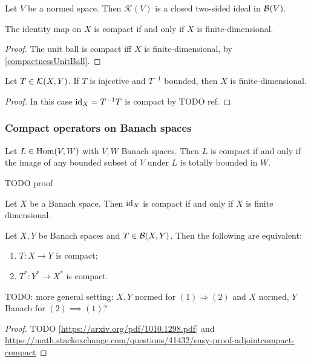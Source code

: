 \begin{proposition}
Let $V$ be a normed space. Then $\mathcal{K}(V)$ is a closed two-sided ideal in $\operatorname{\mathcal{B}}(V)$.
\end{proposition}

\begin{lemma}
The identity map on $X$ is compact \textup{if and only if} $X$ is finite-dimensional.
\end{lemma}
\begin{proof}
The unit ball is compact iff $X$ is finite-dimensional, by \ref{compactnessUnitBall}.
\end{proof}
\begin{corollary}
Let $T\in\operatorname{\mathcal{K}}(X,Y)$. If $T$ is injective and $T^{-1}$ bounded, then $X$ is finite-dimensional.
\end{corollary}
\begin{proof}
In this case $\operatorname{id}_X = T^{-1}T$ is compact by TODO ref.
\end{proof}

\subsubsection{Compact operators on Banach spaces}
\begin{proposition}
Let $L\in\operatorname{Hom}(V,W)$ with $V,W$ Banach spaces. Then $L$ is compact \textup{if and only if} the image of any bounded subset of $V$ under $L$ is totally bounded in $W$.
\end{proposition}
TODO proof

\begin{lemma} \label{identityCompactFiniteDimensional}
Let $X$ be a Banach space. Then $\operatorname{id}_X$ is compact \textup{if and only if} $X$ is finite dimensional.
\end{lemma}

\begin{theorem} \label{SchaudersTheorem}
Let $X,Y$ be Banach spaces and $T\in\operatorname{\mathcal{B}}(X,Y)$. Then the following are equivalent:
\begin{enumerate}
\item $T: X\to Y$ is compact;
\item $T^*: Y^* \to X^*$ is compact.
\end{enumerate}
\end{theorem}
TODO: more general setting: $X,Y$ normed for $(1) \Rightarrow (2)$ and $X$ normed, $Y$ Banach for $(2)\implies (1)$?
\begin{proof}
TODO \ref{https://arxiv.org/pdf/1010.1298.pdf} and \url{https://math.stackexchange.com/questions/41432/easy-proof-adjointcompact-compact}
\end{proof}

